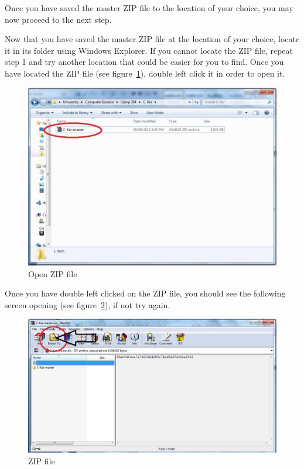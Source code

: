 \documentclass[12pt]{article}
\begin{document}
Once you have saved the master ZIP file to the location of your choice, you may now proceed to the next step.\par


\vspace*{0.2in}
\vspace*{0.2in}
Now that you have saved the master ZIP file at the location of your choice, locate it in its folder using Windows Explorer. If you cannot locate the ZIP file, repeat step 1 and try another location that could be easier for you to find. Once you have located the ZIP file (see figure~\ref{fig:Open ZIP file}), double left click it in order to open it.
\begin{figure}[h!]
    \centering
    \includegraphics[scale=1]{insta3}
    \caption{Open ZIP file}
    \label{fig:Open ZIP file}
\end{figure}\par

Once you have double left clicked on the ZIP file, you should see the following screen opening (see figure~\ref{fig:ZIP file}), if not try again.
\begin{figure}[h!]
    \centering
    \includegraphics[scale=1]{insta4}
    \caption{ZIP file}
    \label{fig:ZIP file}
\end{figure}\par
\end{document}
